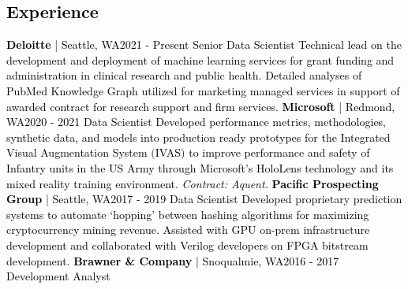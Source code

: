 \documentclass{article}
\begin{document}
    \begin{bgbox}[
        height = \paperheight,
        width = 0.69\textwidth,
        colback = white
    ]
        \textcolor{black}{
            \section*{Experience}
                \textbf{Deloitte} | Seattle, WA\hfill{2021 - Present}\newline
                    Senior Data Scientist\newline\newline
                Technical lead on the development and deployment of machine learning services for grant funding and administration in clinical research and public health. Detailed analyses of PubMed Knowledge Graph utilized for marketing managed services in support of awarded contract for research support and firm services.\newline\newline
                \textbf{Microsoft} | Redmond, WA\hfill{2020 - 2021}\newline
                    Data Scientist\newline\newline
                Developed performance metrics, methodologies, synthetic data, and models into production ready prototypes for the Integrated Visual Augmentation System $($IVAS$)$ to improve performance and safety of Infantry units in the US Army through Microsoft’s HoloLens technology and its mixed reality training environment. \textit{Contract: Aquent.}\newline\newline
                \textbf{Pacific Prospecting Group} | Seattle, WA\hfill{2017 - 2019}\newline
                    Data Scientist\newline\newline
                Developed proprietary prediction systems to automate ‘hopping’ between hashing algorithms for maximizing cryptocurrency mining revenue. Assisted with GPU on-prem infrastructure development and collaborated with Verilog developers on FPGA bitstream development.\newline\newline
                \textbf{Brawner \& Company} | Snoqualmie, WA\hfill{2016 - 2017}\newline
                    Development Analyst\newline\newline
}
\end{bgbox}
\end{document}
